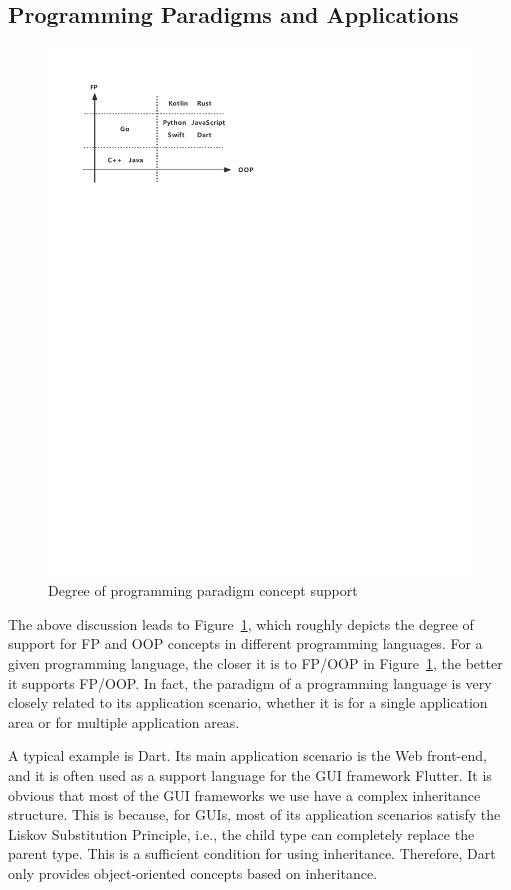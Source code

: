 \subsection{Programming Paradigms and Applications}

\begin{figure}[htbp]
    \centerline{\includegraphics[scale=0.8]{figures/paradigm}}
    \caption{Degree of programming paradigm concept support}
    \label{fig:paradigm}
\end{figure}

The above discussion leads to Figure~\ref{fig:paradigm}, which roughly depicts the degree of support for FP and OOP concepts in different programming languages.
For a given programming language, the closer it is to FP/OOP in Figure~\ref{fig:paradigm}, the better it supports FP/OOP. In fact, the paradigm of a programming language is very closely related to its application scenario, whether it is for a single application area or for multiple application areas.

A typical example is Dart. Its main application scenario is the Web front-end, and it is often used as a support language for the GUI framework Flutter. It is obvious that most of the GUI frameworks we use have a complex inheritance structure. This is because, for GUIs, most of its application scenarios satisfy the Liskov Substitution Principle, i.e., the child type can completely replace the parent type. This is a sufficient condition for using inheritance. Therefore, Dart only provides object-oriented concepts based on inheritance.

